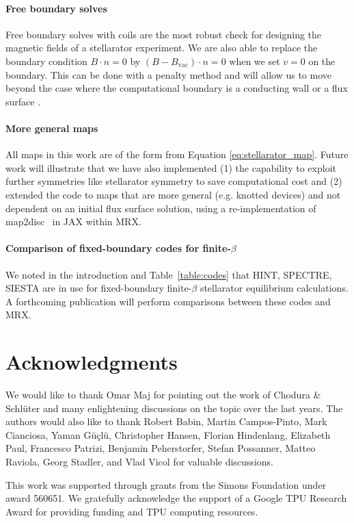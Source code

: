 \documentclass[%
 reprint,
 superscriptaddress,
 amsmath,amssymb,
 aps, nofootinbib, floatfix]{revtex4-2}
\begin{document}
\paragraph{Free boundary solves}
Free boundary solves with coils are the most robust check for designing the magnetic fields of a stellarator experiment. We are also able to replace the boundary condition $B \cdot n = 0$ by $(B - B_{\mathrm{vac}}) \cdot n = 0$ when we set $v = 0$ on the boundary. This can be done with a penalty method and will allow us to move beyond the case where the computational boundary is a conducting wall or a flux surface \cite{kaptanoglu_computational_2026}. 
\paragraph{More general maps}
All maps in this work are of the form from Equation \eqref{eq:stellarator_map}. Future work will illustrate that we have also implemented (1) the capability to exploit further symmetries like stellarator symmetry to save computational cost and (2) extended the code to maps that are more general (e.g. knotted devices) and not dependent on an initial flux surface solution, using a re-implementation of map2disc~\citep{babin2025construction} in JAX within MRX.
\paragraph{Comparison of fixed-boundary codes for finite-$\beta$}
We noted in the introduction and Table~\ref{table:codes} that HINT, SPECTRE, SIESTA are in use for fixed-boundary finite-$\beta$ stellarator equilibrium calculations. A forthcoming publication will perform comparisons between these codes and MRX.  

\section*{Acknowledgments}
We would like to thank Omar Maj for pointing out the work of Chodura \& Schlüter and many enlightening discussions on the topic over the last years.
The authors would also like to thank Robert Babin, Martin Campos-Pinto, Mark Cianciosa, Yaman Güçlü, Christopher Hansen, Florian Hindenlang, Elizabeth Paul, Francesco Patrizi, Benjamin Peherstorfer, Stefan Possanner, Matteo Raviola, Georg Stadler, and Vlad Vicol for valuable discussions.

This work was supported through grants from the Simons Foundation under award 560651. We gratefully acknowledge the support of a Google TPU Research Award for providing funding and TPU computing resources.
\end{document}
